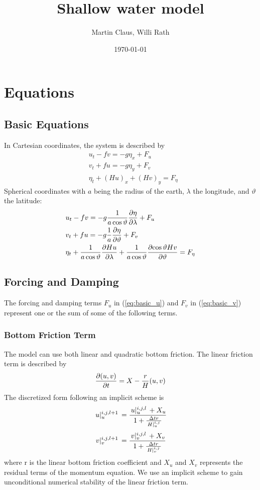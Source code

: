 \documentclass[a4paper]{article}
\title{Shallow water model}
\author{Martin Claus, Willi Rath}
\date{\today}
\begin{document}
\maketitle


\section{Equations}
\subsection{Basic Equations}
In Cartesian coordinates, the system is described by
\begin{align}
  \label{eq:basic_u}
  & u_t - fv = -g \eta_x + F_u \\
  \label{eq:basic_v}
  & v_t + fu = -g \eta_y + F_v \\
  \label{eq:basic_eta}
  & \eta_t + (Hu)_x + (Hv)_y = F_\eta
\end{align}
Spherical coordinates with $a$ being the radius of the earth, $\lambda$ the 
longitude, and $\vartheta$ the latitude:
\begin{align}
  & u_t - fv = -g \frac{1}{a\cos\vartheta}\frac{\partial {\eta}}{\partial {\lambda}} + F_u \\
  & v_t + fu = -g \frac{1}{a}\frac{\partial {\eta}}{\partial {\vartheta}} + F_v \\
  & \eta_t + \frac{1}{a\cos\vartheta}\frac{\partial {Hu}}{\partial {\lambda}} + \frac{1}{a\cos\vartheta}\frac{\partial {\cos\vartheta Hv}}{\partial {\vartheta}} = F_\eta
\end{align}
\subsection{Forcing and Damping}
The forcing and damping terms $F_u$ in (\ref{eq:basic_u}) and $F_v$ in (\ref{eq:basic_v}) represent one or the sum of some of the following terms.

\subsubsection{Bottom Friction Term}
The model can use both linear and quadratic bottom friction.
The linear friction term is described by
\begin{equation}
 \frac{\partial {(u,v)}}{\partial {t}} = X -\frac rH (u,v)
\end{equation}
The discretized form following an implicit scheme is
\begin{equation}
  \,{u}\vert_{u}^{{i},{j},{l+1}}\, = \frac{\,{u}\vert_{u}^{{i},{j},{l}}\, + X_u}{1+\frac{\Delta t r}{\,{H}\vert_{u}^{{i},{j}}\,}}
\end{equation}
\begin{equation}
  \,{v}\vert_{v}^{{i},{j},{l+1}}\, = \frac{\,{v}\vert_{v}^{{i},{j},{l}}\, + X_v}{1+\frac{\Delta t r}{\,{H}\vert_{v}^{{i},{j}}\,}}
\end{equation}
where r is the linear bottom friction coefficient and $X_u$ and $X_v$ represents the residual terms of the momentum equation. We use an implicit scheme
to gain unconditional numerical stability of the linear friction term.
\end{document}
